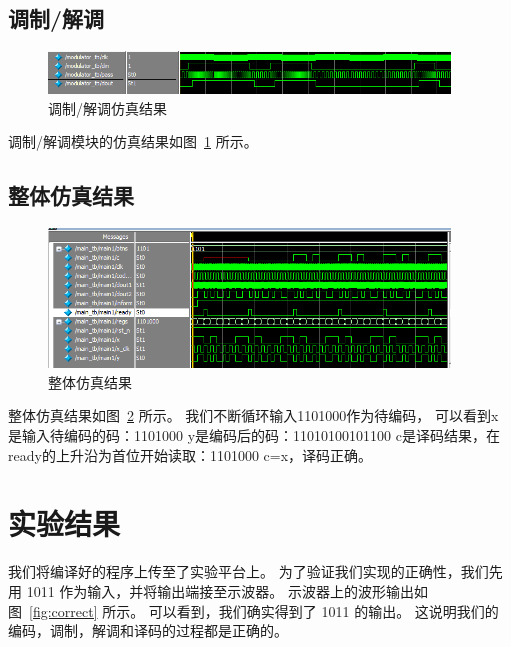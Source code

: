 \documentclass[UTF8]{ctexart}
\begin{document}
\subsection{调制/解调}

\begin{figure}[htbp]
    \centering
    \includegraphics[width=0.95\textwidth]{figs/modulation-sim}
    \caption{调制/解调仿真结果}
    \label{fig:modulation-sim}
\end{figure}

调制/解调模块的仿真结果如图~\ref{fig:modulation-sim} 所示。

\subsection{整体仿真结果}

\begin{figure}[htbp]
    \centering
    \includegraphics[width=0.95\textwidth]{figs/sim}
    \caption{整体仿真结果}
    \label{fig:sim}
\end{figure}

整体仿真结果如图~\ref{fig:sim} 所示。
我们不断循环输入1101000作为待编码，
可以看到x是输入待编码的码：1101000
y是编码后的码：11010100101100
c是译码结果，在ready的上升沿为首位开始读取：1101000
c=x，译码正确。


\section{实验结果}

我们将编译好的程序上传至了实验平台上。
为了验证我们实现的正确性，我们先用 1011 作为输入，并将输出端接至示波器。
示波器上的波形输出如图~\ref{fig:correct} 所示。
可以看到，我们确实得到了 1011 的输出。
这说明我们的编码，调制，解调和译码的过程都是正确的。
\end{document}

